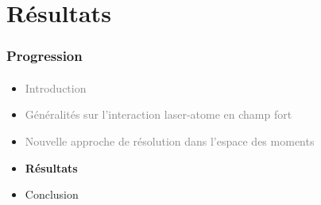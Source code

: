 \section{R\'esultats}

\begin{frame}
 \frametitle{Progression}
 \framesubtitle{}
 \begin{itemize}
   \item \textcolor{gray}{Introduction}
   \item \textcolor{gray}{G\'en\'eralit\'es sur l'interaction laser-atome
en champ fort}
   \item \textcolor{gray}{Nouvelle approche de r\'esolution 
dans l'espace des moments}
   \item \textbf{R\'esultats}
   \item Conclusion
 \end{itemize}
\end{frame}



